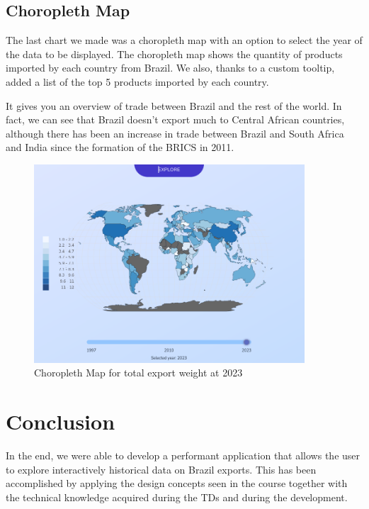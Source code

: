 \documentclass[12pt,a4]{article}
\begin{document}
\subsection{Choropleth Map}
The last chart we made was a choropleth map with an option to select the year of the data to be displayed. The choropleth map shows the quantity of products imported by each country from Brazil. We also, thanks to a custom tooltip, added a list of the top 5 products imported by each country.

It gives you an overview of trade between Brazil and the rest of the world. In fact, we can see that Brazil doesn't export much to Central African countries, although there has been an increase in trade between Brazil and South Africa and India since the formation of the BRICS in 2011.

\begin{figure}[H]
    \centering
    \includegraphics[width=0.9\textwidth]{assets/choro1.png}
    \caption{Choropleth Map for total export weight at 2023}
\end{figure}

\section{Conclusion}
In the end, we were able to develop a performant application that allows the user to explore interactively historical data on Brazil exports. This has been accomplished by applying the design concepts seen in the course together with the technical knowledge acquired during the TDs and during the development.
\end{document}
